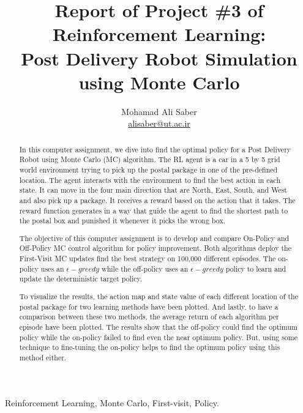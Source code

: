 \documentclass[lettersize,journal]{IEEEtran}
\begin{document}
\title{Report of Project \#3 of Reinforcement Learning: \\Post Delivery Robot Simulation using Monte Carlo}

\author{Mohamad Ali Saber \\ \href{mailto:alisaber@ut.ac.ir}{alisaber@ut.ac.ir}}
\maketitle

\begin{abstract}
In this computer assignment, we dive into find the optimal policy for a Post Delivery Robot using Monte Carlo (MC) algorithm. The RL agent is a car in a 5 by 5 grid world environment trying to pick up the postal package in one of the pre-defined location. The agent interacts with the environment to find the best action in each state. It can move in the four main direction that are North, East, South, and West and also pick up a package. It receives a reward based on the action that it takes. The reward function generates in a way that guide the agent to find the shortest path to the postal box and punished it whenever it picks the wrong box.\par

The objective of this computer assignment is to develop and compare On-Policy and Off-Policy MC control algorithm for policy improvement. Both algorithms deploy the First-Visit MC updates find the best strategy on 100,000 different episodes. The on-policy uses an $\epsilon-greedy$ while the off-policy uses an $\epsilon-greedy$ policy to learn and update the deterministic target policy.\par

To visualize the results, the action map and state value of each different location of the postal package for two learning methods have been plotted. And lastly, to have a comparison between these two methods, the average return of each algorithm per episode have been plotted. The results show that the off-policy could find the optimum policy while the on-policy failed to find even the near optimum policy. But, using some technique to fine-tuning the on-policy helps to find the optimum policy using this method either.
\end{abstract}

\begin{IEEEkeywords}
Reinforcement Learning, Monte Carlo, First-visit, Policy.
\end{IEEEkeywords}
\end{document}
